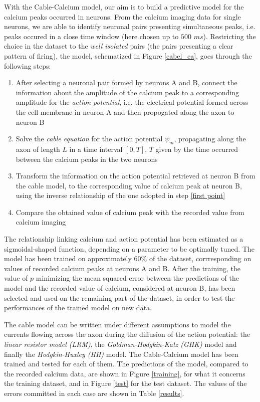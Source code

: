 \documentclass[11pt,a4paper,twocolumn]{article}
\begin{document}
With the Cable-Calcium model, our aim is to build a predictive model for the calcium peaks occurred in neurons. From the calcium imaging data for single neurons, we are able to identify neuronal pairs presenting simultaneous peaks, i.e. peaks occured in a close time window (here chosen up to $500$ $ms$). Restricting the choice in the dataset to the \textit{well isolated} pairs (the pairs presenting a clear pattern of firing), the model, schematized in Figure \ref{cabel_ca}, goes through the following steps:



\begin{enumerate}
	\item After selecting a neuronal pair formed by neurons A and B,  connect the information about the amplitude of the calcium peak to a corresponding amplitude for the \textit{action potential}, i.e. the electrical potential formed across the cell membrane in neuron A and then propogated along the axon to neuron B \label{first point}
	
	\item Solve the \textit{cable equation} for the action potential $\psi_m$, propagating along the axon of length $L$ in a time interval $[0,T]$, $T$ given by the time occurred between the calcium peaks in the two neurons
	
	\item Transform the information on the action potential retrieved at neuron B from the cable model, to the corresponding value of calcium peak at neuron B, using the inverse relationship of the one adopted in step \ref{first point}
	
	\item Compare the obtained value of calcium peak with the recorded value from calcium imaging

\end{enumerate}

The relationship linking calcium and action potential has been estimated as a sigmoidal-shaped function, depending on a parameter to be optimally tuned.
The model has been trained on approximately $60\%$ of the dataset, corrresponding on values of recorded calcium peaks at neurons A  and B. After the training, the value of $p$ minimizing the mean squared error between the predictions of the model and the recorded value of calcium, considered at neuron B, has been selected and used on the remaining part of the dataset, in order to test the performances of the trained model on new data.

The cable model can be written under different assumptions to model the currents flowing across the axon during the diffusion of the action potential: the \textit{linear resistor model (LRM)}, the \textit{Goldman-Hodgkin-Katz (GHK)} model and finally the \textit{Hodgkin-Huxley (HH)} model. The Cable-Calcium model has been trained and tested for each of them. The predictions of the model, compared to the recorded calcium data, are shown in Figure \ref{training}, for what it concerns the training dataset, and in Figure \ref{test} for the test dataset. The values of the errors committed in each case are shown in Table \ref{results}.
\end{document}
